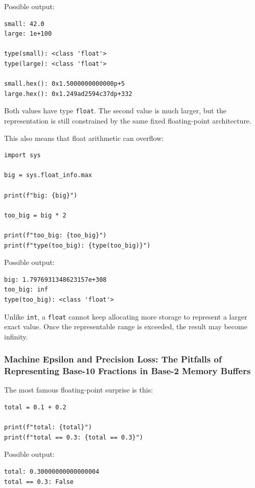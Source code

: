 Possible output:

\begin{verbatim}
small: 42.0
large: 1e+100

type(small): <class 'float'>
type(large): <class 'float'>

small.hex(): 0x1.5000000000000p+5
large.hex(): 0x1.249ad2594c37dp+332
\end{verbatim}

Both values have type \texttt{float}. The second value is much larger, but the representation is still constrained by the same fixed floating-point architecture.

This also means that float arithmetic can overflow:

\begin{verbatim}
import sys

big = sys.float_info.max

print(f"big: {big}")

too_big = big * 2

print(f"too_big: {too_big}")
print(f"type(too_big): {type(too_big)}")
\end{verbatim}

Possible output:

\begin{verbatim}
big: 1.7976931348623157e+308
too_big: inf
type(too_big): <class 'float'>
\end{verbatim}

Unlike \texttt{int}, a \texttt{float} cannot keep allocating more storage to represent a larger exact value. Once the representable range is exceeded, the result may become infinity.

\subsubsection{Machine Epsilon and Precision Loss: The Pitfalls of Representing Base-10 Fractions in Base-2 Memory Buffers}

The most famous floating-point surprise is this:

\begin{verbatim}
total = 0.1 + 0.2

print(f"total: {total}")
print(f"total == 0.3: {total == 0.3}")
\end{verbatim}

Possible output:

\begin{verbatim}
total: 0.30000000000000004
total == 0.3: False
\end{verbatim}

